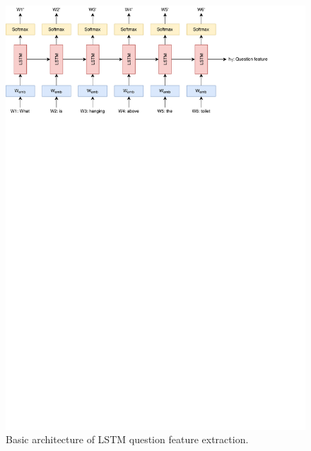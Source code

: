 \documentclass{article}
\begin{document}
\begin{figure}[H]
	\centering
	\includegraphics[width=\linewidth]{lstm.pdf}
	\caption{Basic architecture of LSTM question feature extraction.}
	\label{fig:lstm}
\end{figure}
\end{document}
